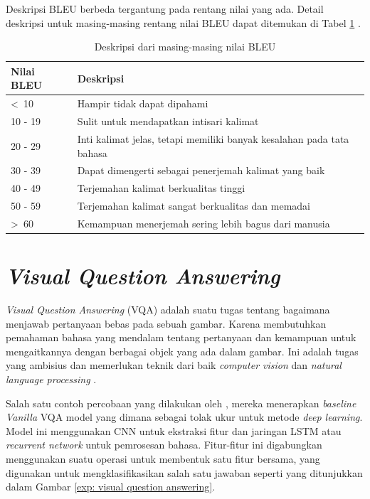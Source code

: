 \par Deskripsi BLEU berbeda tergantung pada rentang nilai yang ada. Detail deskripsi untuk masing-masing rentang nilai BLEU dapat ditemukan di Tabel \ref{tabel-bleu} \citep{lavie2010evaluating}.

\begin{table}[H]
    \centering
    \caption{Deskripsi dari masing-masing nilai BLEU}
    \label{tabel-bleu}
    \begin{tabular}{|l|l|}
    \hline
    \textbf{Nilai BLEU} & \textbf{Deskripsi}                                                    \\ \hline
    \textless\ 10       & Hampir tidak dapat dipahami                                           \\ \hline
    10 - 19             & Sulit untuk mendapatkan intisari kalimat                              \\ \hline
    20 - 29             & Inti kalimat jelas, tetapi memiliki banyak kesalahan pada tata bahasa \\ \hline
    30 - 39             & Dapat dimengerti sebagai penerjemah kalimat yang baik                 \\ \hline
    40 - 49             & Terjemahan kalimat berkualitas tinggi                                 \\ \hline
    50 - 59             & Terjemahan kalimat sangat berkualitas dan memadai                     \\ \hline
    \textgreater\ 60    & Kemampuan menerjemah sering lebih bagus dari manusia                  \\ \hline
    \end{tabular}
\end{table}


\section{\textit{Visual Question Answering}}

\par \textit{Visual Question Answering} (VQA) adalah suatu tugas tentang bagaimana menjawab pertanyaan bebas pada sebuah gambar. Karena membutuhkan pemahaman bahasa yang mendalam tentang pertanyaan dan kemampuan untuk mengaitkannya dengan berbagai objek yang ada dalam gambar. Ini adalah tugas yang ambisius dan memerlukan teknik dari baik \textit{computer vision} dan \textit{natural language processing} \citep{hildebrandt2020scene}.

\par Salah satu contoh percobaan yang dilakukan oleh \citep{antol2015vqa}, mereka menerapkan \textit{baseline} \textit{Vanilla} VQA model yang dimana sebagai tolak ukur untuk metode \textit{deep learning}. Model ini menggunakan CNN untuk ekstraksi fitur dan jaringan LSTM atau \textit{recurrent network} untuk pemrosesan bahasa. Fitur-fitur ini digabungkan menggunakan suatu operasi untuk membentuk satu fitur bersama, yang digunakan untuk mengklasifikasikan salah satu jawaban seperti yang ditunjukkan dalam Gambar \ref{exp: visual question answering}.

